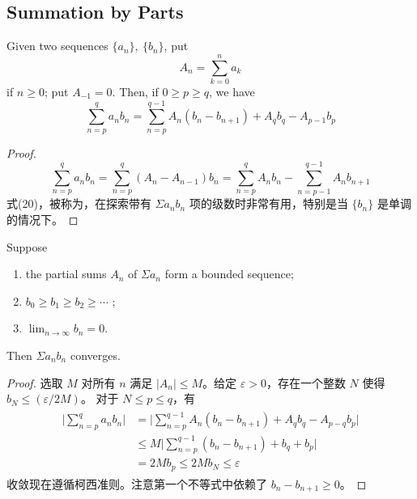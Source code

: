 \documentclass[../poma-notes.tex]{subfiles}
\begin{document}
\subsection*{Summation by Parts}

\begin{theorem}
  Given two sequences $\{a_n\},\ \{b_n\}$, put
  \[ A_n = \sum_{k=0}^{n} a_k \]
  if $n \ge 0$; put $A_{-1} = 0$. Then, if $0 \ge p \ge q$, we have
  \begin{equation}
    \sum_{n=p}^{q} a_n b_n = \sum_{n=p}^{q-1} A_n(b_n-b_{n+1}) + A_q b_q - A_{p-1}b_p
  \end{equation}
\end{theorem}

\begin{proof}
  \[
    \sum_{n=p}^{q} a_n b_n = \sum_{n=p}^{q}(A_n - A_{n-1})b_n = \sum_{n=p}^{q} A_n b_n - \sum_{n=p-1}^{q-1}A_n b_{n+1}
  \]
  式(20)，被称为，在探索带有 $\Sigma a_n b_n$ 项的级数时非常有用，特别是当 $\{b_n\}$
  是单调的情况下。
\end{proof}

\begin{theorem}
  Suppose
  \begin{enumerate}[label=(\alph*)]
    \item the partial sums $A_n$ of $\Sigma a_n$ form a bounded sequence;
    \item $b_0 \ge b_1 \ge b_2 \ge \cdots$ ;
    \item $\lim_{n\to\infty} b_n = 0$.
  \end{enumerate}
  Then $\Sigma a_n b_n$ converges.
\end{theorem}

\begin{proof}
  选取 $M$ 对所有 $n$ 满足 $|A_n| \le M$。给定 $\varepsilon > 0$，存在一个整数 $N$ 使得 $b_N \le (\varepsilon/2M)$。
  对于 $N \le p \le q$，有
  \begin{align*}
    \begin{split}
      \Biggl|\sum_{n=p}^{q} a_n b_n\Biggr| & = \Biggl|\sum_{n=p}^{q-1} A_n(b_n - b_{n+1}) + A_q b_q - A_{p-q} b_p\Biggr| \\
      & \le M \Biggl|\sum_{n=p}^{q-1}(b_n-b_{n+1}) + b_q + b_p\Biggr| \\
      & = 2M b_p \le 2M b_N \le \varepsilon
    \end{split}
  \end{align*}
  收敛现在遵循柯西准则。注意第一个不等式中依赖了 $b_n - b_{n+1} \ge 0$。
\end{proof}

\end{document}
